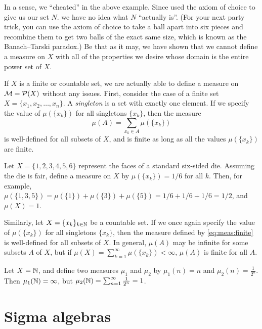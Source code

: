 \documentclass[main.tex]{subfiles}
\begin{document}
In a sense, we ``cheated'' in the above example. Since used the axiom of choice to give us our set $N$. we have no idea what $N$ ``actually is''. (For your next party trick, you can use the axiom of choice to take a ball apart into six pieces and recombine them to get two balls of the exact same size, which is known as the Banach–Tarski paradox.) Be that as it may, we have shown that we cannot define a measure on $X$ with all of the properties we desire whose domain is the entire power set of $X$. 

If $X$ is a finite or countable set, we are actually able to define a measure on ${\mathcal M} = {\mathcal P}(X)$ without any issues. First, consider the case of a finite set $X = \{ x_1, x_2, \dots, x_n \}$. A \emph{singleton} is a set with exactly one element. If we specify the value of $\mu\left(\{ x_k \}\right)$ for all singletons $\{ x_k \}$, then the measure
\begin{equation}\label{eq:meas:finite}
\mu(A) = \sum_{x_k \in A} \mu\left(\{ x_k \}\right)
\end{equation}
is well-defined for all subsets of $X$, and is finite as long as all the values $\mu\left(\{ x_k \}\right)$ are finite.

\begin{example}Let $X = \{ 1, 2, 3, 4, 5, 6\}$ represent the faces of a standard six-sided die. Assuming the die is fair, define a measure on $X$ by $\mu\left(\{ x_k \}\right) = 1/6$ for all $k$. Then, for example, $\mu(\{1,3,5\}) = \mu(\{1\})+\mu(\{3\})+\mu(\{5\}) = 1/6+1/6+1/6 = 1/2$, and $\mu(X) = 1$.
\end{example}

Similarly, let $X = \{ x_k\}_{k \in {\mathbb N}}$ be a countable set. If we once again specify the value of $\mu\left(\{ x_k \}\right)$ for all singletons $\{ x_k \}$, then the measure defined by \cref{eq:meas:finite} is well-defined for all subsets of $X$. In general, $\mu(A)$ may be infinite for some subsets $A$ of $X$, but if $\mu(X) = \sum_{k=1}^\infty \mu\left(\{ x_k\}\right) < \infty$, $\mu(A)$ is finite for all $A$.

\begin{example}Let $X = {\mathbb N}$, and define two measures $\mu_1$ and $\mu_2$ by $\mu_1(n) = n$ and $\mu_2(n) = \frac{1}{2^n}$. Then $\mu_1({\mathbb N}) = \infty$, but $\mu_2({\mathbb N}) = \sum_{n=1}^\infty \frac{1}{2^n} = 1$.
\end{example}

\section{Sigma algebras}
\end{document}
